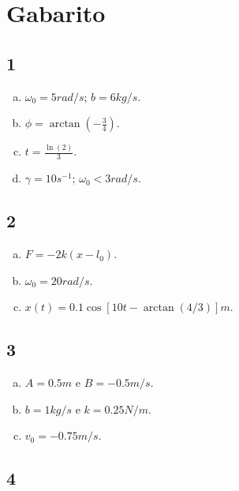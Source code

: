 \documentclass[a4paper,10pt]{article}
\begin{document}
\pagebreak

\section*{Gabarito}

\subsection*{1}

\begin{enumerate}[(a)]
\item $\omega_0 = 5 \unit{rad/s}$; $b = 6 \unit{kg/s}$.

\item $\phi = \arctan(-\frac{3}{4})$.

\item $t = \frac{\ln(2)}{3}$.

\item $\gamma = 10 \unit{s^{-1}}$; $\omega_0 < 3 \unit{rad/s}$.
\end{enumerate}

\subsection*{2}

\begin{enumerate}[(a)]
\item $F = -2k(x-l_0)$.

\item $\omega_0 = 20 \unit{rad/s}$.

\item $x(t) = 0.1 \cos[10t - \arctan(4/3)] \unit{m}$.
\end{enumerate}

\subsection*{3}

\begin{enumerate}[(a)]
\item $A = 0.5 \unit{m}$ e $B = -0.5 \unit{m/s}$.

\item $b = 1 \unit{kg/s}$ e $k = 0.25 \unit{N/m}$.

\item $v_0 = -0.75 \unit{m/s}$.
\end{enumerate}


\subsection*{4}
\end{document}
